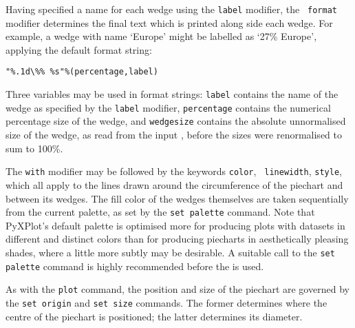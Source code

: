 Having specified a name for each wedge using the {\tt label} modifier, the {\tt
format} modifier determines the final text which is printed along side each
wedge.  For example, a wedge with name `Europe' might be labelled as `27\%
Europe', applying the default format string:
\begin{verbatim}
"%.1d\%% %s"%(percentage,label)
\end{verbatim}
Three variables may be used in format strings: {\tt label} contains the name of
the wedge as specified by the {\tt label} modifier, {\tt percentage} contains
the numerical percentage size of the wedge, and {\tt wedgesize} contains the
absolute unnormalised size of the wedge, as read from the input \datafile,
before the sizes were renormalised to sum to 100\%.

The {\tt with} modifier may be followed by the keywords {\tt color}, {\tt
linewidth}, {\tt style}, which all apply to the lines drawn around the
circumference of the piechart and between its wedges. The fill color of the
wedges themselves are taken sequentially from the current palette, as set by
the {\tt set palette} command. Note that PyXPlot's default palette is optimised
more for producing plots with datasets in different and distinct colors than
for producing piecharts in aesthetically pleasing shades, where a little more
subtly may be desirable. A suitable call to the {\tt set palette} command is
highly recommended before the  is used.

As with the {\tt plot} command, the position and size of the piechart are
governed by the {\tt set origin} and {\tt set size} commands. The former
determines where the centre of the piechart is positioned; the latter
determines its diameter.


